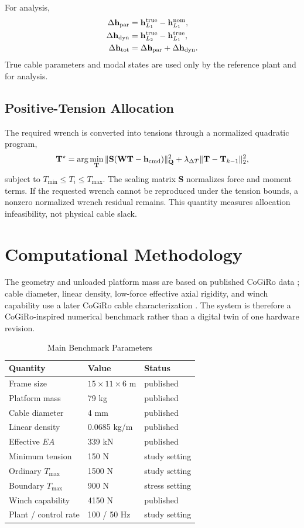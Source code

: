 \documentclass[conference]{IEEEtran}
\begin{document}
For analysis,
\begin{align}
\Delta\mathbf h_{\rm par}&=\mathbf h_{L_1}^{\rm true}-\mathbf h_{L_1}^{\rm nom},\\
\Delta\mathbf h_{\rm dyn}&=\mathbf h_{L_2}^{\rm true}-\mathbf h_{L_1}^{\rm true},\\
\Delta\mathbf h_{\rm tot}&=\Delta\mathbf h_{\rm par}+\Delta\mathbf h_{\rm dyn}.
\end{align}
True cable parameters and modal states are used only by the reference plant and for analysis.

\subsection{Positive-Tension Allocation}
The required wrench is converted into tensions through a normalized quadratic program,
\begin{equation}
\mathbf T^\star=\arg\min_{\mathbf T}
\|\mathbf S(\mathbf W\mathbf T-\mathbf h_{\rm cmd})\|_{\mathbf Q}^{2}
+\lambda_{\Delta T}\|\mathbf T-\mathbf T_{k-1}\|_2^2 ,
\end{equation}
subject to $T_{\min}\le T_i\le T_{\max}$. The scaling matrix $\mathbf S$ normalizes force and moment terms. If the requested wrench cannot be reproduced under the tension bounds, a nonzero normalized wrench residual remains. This quantity measures allocation infeasibility, not physical cable slack.

\section{Computational Methodology}
The geometry and unloaded platform mass are based on published CoGiRo data \cite{ElGhazaly2014}; cable diameter, linear density, low-force effective axial rigidity, and winch capability use a later CoGiRo cable characterization \cite{Izard2017}. The system is therefore a CoGiRo-inspired numerical benchmark rather than a digital twin of one hardware revision.

\begin{table}[t]
\caption{Main Benchmark Parameters}
\centering\footnotesize
\begin{tabular}{lll}
\toprule
Quantity & Value & Status\\
\midrule
Frame size & $15\times11\times6$ m & published\\
Platform mass & 79 kg & published\\
Cable diameter & 4 mm & published\\
Linear density & 0.0685 kg/m & published\\
Effective $EA$ & 339 kN & published\\
Minimum tension & 150 N & study setting\\
Ordinary $T_{\max}$ & 1500 N & study setting\\
Boundary $T_{\max}$ & 900 N & stress setting\\
Winch capability & 4150 N & published\\
Plant / control rate & 100 / 50 Hz & study setting\\
\bottomrule
\end{tabular}
\end{table}
\end{document}
